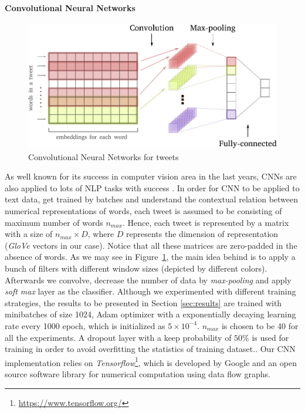 \paragraph{\textbf{Convolutional Neural Networks}}
\begin{figure}[t]
	\centering
	\includegraphics[width=0.8\columnwidth]{CNN_text.pdf}
	\caption{Convolutional Neural Networks for tweets}
	\label{fig:cnn}
\end{figure}

As well known for its success in computer vision area in the last years, CNNs are also applied to lots of NLP tasks with success \cite{kim14conv}. 
In order for CNN to be applied to text data, get trained by batches and understand the contextual relation between numerical representations of words, each tweet is assumed to be consisting of maximum number of words $n_{max}$. 
Hence, each tweet is represented by a matrix with a size of $n_{max} \times D$, where $D$ represents the dimension of representation (\textit{GloVe} vectors in our case).
Notice that all these matrices are zero-padded in the absence of words.
As we may see in Figure~\ref{fig:cnn}, the main idea behind is to apply a bunch of filters with different window sizes (depicted by different colors). Afterwards we convolve, decrease the number of data by \textit{max-pooling} and apply \textit{soft max} layer as the classifier.
Although we experimented with different training strategies, the results to be presented in Section \ref{sec:results} are trained with minibatches of size 1024, Adam optimizer with a exponentially decaying learning rate every 1000 epoch, which is initialized as $5 \times 10^{-4}$. 
$n_{max}$ is chosen to be 40 for all the experiments.
A dropout layer with a keep probability of $50\%$ is used for training in order to avoid overfitting the statistics of training dataset..
Our CNN implementation relies on \textit{Tensorflow}\footnote{\url{https://www.tensorflow.org/}}, which is developed by Google and an open source software library for numerical computation using data flow graphs.